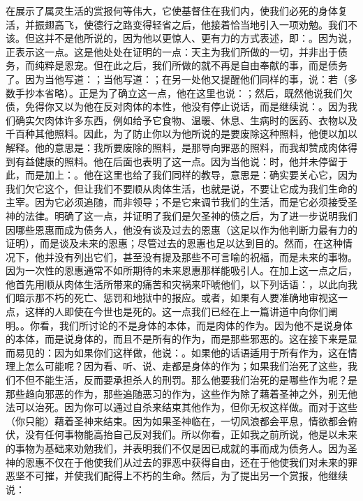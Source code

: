 在展示了属灵生活的赏报何等伟大，它使基督住在我们内，使我们必死的身体复活，并振翅高飞，使德行之路变得轻省之后，他接着恰当地引入一项劝勉。我们不该。但这并不是他所说的，因为他以更惊人、更有力的方式表述，即：。因为说，正表示这一点。这是他处处在证明的一点：天主为我们所做的一切，并非出于债务，而纯粹是恩宠。但在此之后，我们所做的就不再是自由奉献的事，而是债务了。因为当他写道：；当他写道：；在另一处他又提醒他们同样的事，说：若（多数手抄本省略）。正是为了确立这一点，他在这里也说：；然后，既然他说我们欠债，免得你又以为他在反对肉体的本性，他没有停止说话，而是继续说：。因为我们确实欠肉体许多东西，例如给予它食物、温暖、休息、生病时的医药、衣物以及千百种其他照料。因此，为了防止你以为他所说的是要废除这种照料，他便以加以解释。他的意思是：我所要废除的照料，是那导向罪恶的照料，而我却赞成肉体得到有益健康的照料。他在后面也表明了这一点。因为当他说：时，他并未停留于此，而是加上：。他在这里也给了我们同样的教导，意思是：确实要关心它，因为我们欠它这个，但让我们不要顺从肉体生活，也就是说，不要让它成为我们生命的主宰。因为它必须追随，而非领导；不是它来调节我们的生活，而是它必须接受圣神的法律。明确了这一点，并证明了我们是欠圣神的债之后，为了进一步说明我们因哪些恩惠而成为债务人，他没有谈及过去的恩惠（这足以作为他判断力最有力的证明），而是谈及未来的恩惠；尽管过去的恩惠也足以达到目的。然而，在这种情况下，他并没有列出它们，甚至没有提及那些不可言喻的祝福，而是未来的事物。因为一次性的恩惠通常不如所期待的未来恩惠那样能吸引人。在加上这一点之后，他首先用顺从肉体生活所带来的痛苦和灾祸来吓唬他们，以下列话语：，以此向我们暗示那不朽的死亡、惩罚和地狱中的报应。或者，如果有人要准确地审视这一点，这样的人即使在今世也是死的。这一点我们已经在上一篇讲道中向你们阐明。。你看，我们所讨论的不是身体的本体，而是肉体的作为。因为他不是说身体的本体，而是说身体的，而且不是所有的作为，而是那些邪恶的。这在接下来是显而易见的：因为如果你们这样做，他说：。如果他的话语适用于所有作为，这在情理上怎么可能呢？因为看、听、说、走都是身体的作为；如果我们治死了这些，我们不但不能生活，反而要承担杀人的刑罚。那么他要我们治死的是哪些作为呢？是那些趋向邪恶的作为，那些追随恶习的作为，这些作为除了藉着圣神之外，别无他法可以治死。因为你可以通过自杀来结束其他作为，但你无权这样做。而对于这些（你只能）藉着圣神来结束。因为如果圣神临在，一切风浪都会平息，情欲都会俯伏，没有任何事物能高抬自己反对我们。所以你看，正如我之前所说，他是以未来的事物为基础来劝勉我们，并表明我们不仅是因已成就的事而成为债务人。因为圣神的恩惠不仅在于他使我们从过去的罪恶中获得自由，还在于他使我们对未来的罪恶坚不可摧，并使我们配得上不朽的生命。然后，为了提出另一个赏报，他继续说：\par

